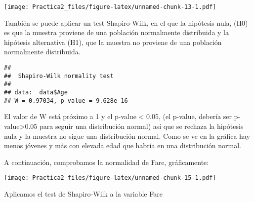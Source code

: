 \documentclass[]{article}
\newenvironment{Shaded}{\begin{snugshade}}{\end{snugshade}}
\newcommand{\KeywordTok}[1]{\textcolor[rgb]{0.13,0.29,0.53}{\textbf{#1}}}
\newcommand{\DataTypeTok}[1]{\textcolor[rgb]{0.13,0.29,0.53}{#1}}
\newcommand{\DecValTok}[1]{\textcolor[rgb]{0.00,0.00,0.81}{#1}}
\newcommand{\StringTok}[1]{\textcolor[rgb]{0.31,0.60,0.02}{#1}}
\newcommand{\CommentTok}[1]{\textcolor[rgb]{0.56,0.35,0.01}{\textit{#1}}}
\newcommand{\OperatorTok}[1]{\textcolor[rgb]{0.81,0.36,0.00}{\textbf{#1}}}
\newcommand{\NormalTok}[1]{#1}
\begin{document}
\texttt{[image: Practica2\_files/figure-latex/unnamed-chunk-13-1.pdf]}

También se puede aplicar un test Shapiro-Wilk, en el que la hipótesis
nula, (H0) es que la muestra proviene de una población normalmente
distribuida y la hipótesis alternativa (H1), que la muestra no proviene
de una población normalmente distribuida.

\begin{Shaded}
\end{Shaded}

\begin{verbatim}
## 
##  Shapiro-Wilk normality test
## 
## data:  data$Age
## W = 0.97034, p-value = 9.628e-16
\end{verbatim}

El valor de W está próximo a 1 y el p-value \textless{} 0.05, (el
p-value, debería ser p-value\textgreater{}0.05 para seguir una
distribución normal) así que se rechaza la hipótesis nula y la muestra
no sigue una distribución normal. Como se ve en la gráfica hay menos
jóvenes y más con elevada edad que habría en una distribución normal.

A continuación, comprobamos la normalidad de Fare, gráficamente:

\begin{Shaded}
\end{Shaded}

\texttt{[image: Practica2\_files/figure-latex/unnamed-chunk-15-1.pdf]}

Aplicamos el test de Shapiro-Wilk a la variable Fare

\begin{Shaded}
\end{Shaded}
\end{document}
